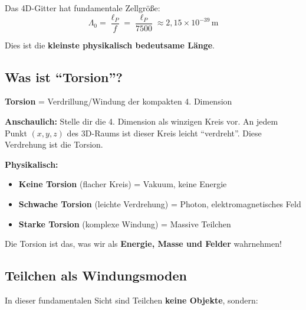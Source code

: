 	Das 4D-Gitter hat fundamentale Zellgröße:
	\begin{equation}
		\Lambda_0 = \frac{\ell_P}{f} = \frac{\ell_P}{7500} \approx 2{,}15 \times 10^{-39}\,\text{m}
	\end{equation}
	
	Dies ist die \textbf{kleinste physikalisch bedeutsame Länge}.
	
	\subsection{Was ist \enquote{Torsion}?}
	
	\begin{philosophical}
		\textbf{Torsion} = Verdrillung/Windung der kompakten 4. Dimension
		
		\vspace{0.3cm}
		
		\textbf{Anschaulich:}
		Stelle dir die 4. Dimension als winzigen Kreis vor. An jedem Punkt $(x,y,z)$ des 3D-Raums ist dieser Kreis leicht \enquote{verdreht}. Diese Verdrehung ist die Torsion.
		
		\vspace{0.3cm}
		
		\textbf{Physikalisch:}
		\begin{itemize}
			\item \textbf{Keine Torsion} (flacher Kreis) = Vakuum, keine Energie
			\item \textbf{Schwache Torsion} (leichte Verdrehung) = Photon, elektromagnetisches Feld
			\item \textbf{Starke Torsion} (komplexe Windung) = Massive Teilchen
		\end{itemize}
		
		Die Torsion ist das, was wir als \textbf{Energie, Masse und Felder} wahrnehmen!
	\end{philosophical}
	
	\subsection{Teilchen als Windungsmoden}
	
	In dieser fundamentalen Sicht sind Teilchen \textbf{keine Objekte}, sondern:
	
